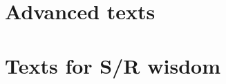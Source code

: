 \documentclass[krantz2,ChapterTOCs]{krantz}\usepackage{knitr}
\begin{document}
\cite{Chang2013,Fox2002,Fox2010,Faraway2004,Faraway2006,Everitt2011,Wickham2017}

\section{Advanced texts}

\cite{Xie2013,Chambers2016,Wickham2015,Wickham2014advanced,Wickham2016,Pinheiro2000,Murrell2011,Matloff2011,Ihaka1996,Venables2000}

\section{Texts for S/R wisdom}

\cite{Burns1998,Burns2011,Burns2012,Bentley1986,Bentley1988}

\backmatter

\printbibliography

\printindex
\end{document}
